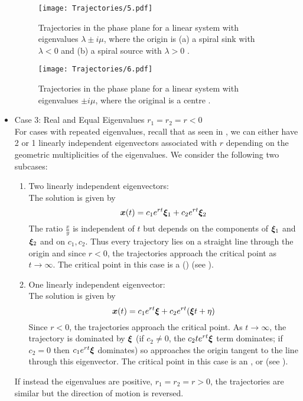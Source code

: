 \begin{itemize}
	\begin{figure}[H]
		\centering
		\texttt{[image: Trajectories/5.pdf]}
		\caption{Trajectories in the phase plane for a linear system with eigenvalues $\lambda \pm i\mu$, where the origin is (a) a spiral sink with $\lambda <0$ and (b) a spiral source with $\lambda >0$ \cite[Figure 9.1.5]{boyce}.}
		\label{fig:trajectory5}
	\end{figure}
	
	\begin{figure}[H]
		\centering
		\texttt{[image: Trajectories/6.pdf]}
		\caption{Trajectories in the phase plane for a linear system with eigenvalues $\pm i\mu$, where the original is a centre \cite[Figure 9.1.6(a)]{boyce}.}
		\label{fig:trajectory6}
	\end{figure}
	
	\item Case 3: Real and Equal Eigenvalues $r_1 = r_2 = r < 0$\\
	For cases with repeated eigenvalues, recall that as seen in , we can either have 2 or 1 linearly independent eigenvectors associated with $r$ depending on the geometric multiplicities of the eigenvalues. We consider the following two subcases:
	\begin{enumerate}[label=(\roman*)]
		\item Two linearly independent eigenvectors: \\ 
		The solution is given by 
		\[
		\bm{x}(t) = c_1 e^{rt} \bm{\xi}_1 + c_2 e^{rt} \bm{\xi}_2
		\]
		The ratio $\frac{x}{y}$ is independent of $t$ but depends on the components of $\bm{\xi}_1$ and $\bm{\xi}_2$ and on $c_1, c_2$. Thus every trajectory lies on a straight line through the origin and since $r<0$, the trajectories approach the critical point as $t \to \infty$. The critical point in this case is a  () (see ).
		
		\item One linearly independent eigenvector: \\
		The solution is given by 
		\[
		\bm{x}(t) = c_1 e^{rt} \bm{\xi} + c_2 e^{rt} (\bm{\xi} t + \eta)
		\]
		Since $r<0$, the trajectories approach the critical point. As $t \to \infty$, the trajectory is dominated by $\bm{\xi}$ (if $c_2 \neq 0$, the $c_2 te^{rt} \bm{\xi}$ term dominates; if $c_2 = 0$ then $c_1 e^{rt} \bm{\xi}$ dominates) so approaches the origin tangent to the line through this eigenvector. The critical point in this case is an , or  (see ).
	\end{enumerate}
	If instead the eigenvalues are positive, $r_1 = r_2 = r > 0$, the trajectories are similar but the direction of motion is reversed.
\end{itemize}

